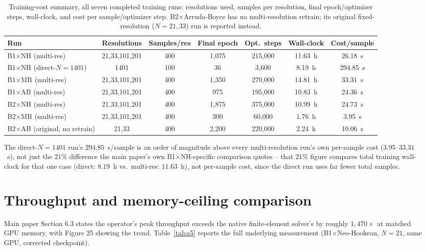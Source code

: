 \documentclass[11pt]{article}
\begin{document}
\begin{table}[h]
\centering
\caption{Training-cost summary, all seven completed training runs:
  resolutions used, samples per resolution, final epoch/optimizer steps,
  wall-clock, and cost per sample/optimizer step. B2$\times$Arruda-Boyce
  has no multi-resolution retrain; its original fixed-resolution
  ($N{=}21,33$) run is reported instead.}
\label{tab:s4}
\footnotesize
\begin{tabular}{lcccccc}
\toprule
Run & Resolutions & Samples/res & Final epoch & Opt.\ steps & Wall-clock & Cost/sample \\
\midrule
B1$\times$NH (multi-res)       & 21,33,101,201 & 400 & 1{,}075 & 215{,}000 & 11.63~h & 26.18~s \\
B1$\times$NH (direct-$N{=}1401$) & 1401        & 100 & 36      & 3{,}600   & 8.19~h  & 294.85~s \\
B1$\times$MR (multi-res)       & 21,33,101,201 & 400 & 1{,}350 & 270{,}000 & 14.81~h & 33.31~s \\
B1$\times$AB (multi-res)       & 21,33,101,201 & 400 & 975     & 195{,}000 & 10.83~h & 24.36~s \\
B2$\times$NH (multi-res)       & 21,33,101,201 & 400 & 1{,}875 & 375{,}000 & 10.99~h & 24.73~s \\
B2$\times$MR (multi-res)       & 21,33,101,201 & 400 & 300     & 60{,}000  & 1.76~h  & 3.95~s \\
B2$\times$AB (original, no retrain) & 21,33     & 400 & 2{,}200 & 220{,}000 & 2.24~h  & 10.06~s \\
\bottomrule
\end{tabular}
\end{table}

The direct-$N{=}1401$ run's $294.85$~s/sample is an order of magnitude
above every multi-resolution run's own per-sample cost ($3.95$--$33.31$~s),
not just the $21\%$ difference the main paper's own B1$\times$NH-specific
comparison quotes -- that $21\%$ figure compares total training
wall-clock for that one case (direct: $8.19$~h vs.\ multi-res: $11.63$~h),
not per-sample cost, since the direct run uses far fewer total samples.

\FloatBarrier
\section{Throughput and memory-ceiling comparison}
\label{sec:s5}
Main paper Section 6.3 states the operator's peak throughput exceeds the
native finite-element solver's by roughly $1{,}470\times$ at matched GPU
memory, with Figure 25 showing the trend. Table~\ref{tab:s5} reports the
full underlying measurement (B1$\times$Neo-Hookean, $N{=}21$, same GPU,
corrected checkpoint).
\end{document}
